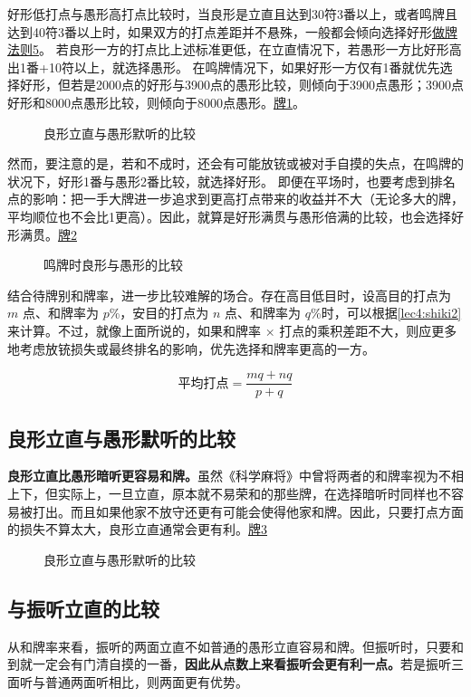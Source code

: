好形低打点与愚形高打点比较时，当良形是立直且达到30符3番以上，或者鸣牌且达到40符3番以上时，如果双方的打点差距并不悬殊，一般都会倾向选择好形\hyperref[lec1:rule5]{做牌法则5}。
若良形一方的打点比上述标准更低，在立直情况下，若愚形一方比好形高出1番+10符以上，就选择愚形。
在鸣牌情况下，如果好形一方仅有1番就优先选择好形，但若是2000点的好形与3900点的愚形比较，则倾向于3900点愚形；3900点好形和8000点愚形比较，则倾向于8000点愚形。\hyperref[lec4:pai1]{牌1}。
\begin{figure}[h]
    \caption{良形立直与愚形默听的比较}\label{lec4:pai1}
\end{figure}
然而，要注意的是，若和不成时，还会有可能放铳或被对手自摸的失点，在鸣牌的状况下，好形1番与愚形2番比较，就选择好形。
即便在平场时，也要考虑到排名点的影响：把一手大牌进一步追求到更高打点带来的收益并不大（无论多大的牌，平均顺位也不会比1更高）。因此，就算是好形满贯与愚形倍满的比较，也会选择好形满贯。\hyperref[lec4:pai2]{牌2}
\begin{figure}[h]
    \caption{鸣牌时良形与愚形的比较}\label{lec4:pai2}
\end{figure}
结合待牌别和牌率，进一步比较难解的场合。存在高目低目时，设高目的打点为 $m$ 点、和牌率为 $p$\%，安目的打点为 $n$ 点、和牌率为 $q$\%时，可以根据\ref{lec4:shiki2}来计算。不过，就像上面所说的，如果和牌率 × 打点的乘积差距不大，则应更多地考虑放铳损失或最终排名的影响，优先选择和牌率更高的一方。
\begin{shiki}[高低目的平均打点]\label{lec4:shiki2}
    \[\mathrm{平均打点} = \frac{mq+nq}{p+q}\]
\end{shiki}

\subsection{良形立直与愚形默听的比较}
\textbf{良形立直比愚形暗听更容易和牌。}虽然《科学麻将》中曾将两者的和牌率视为不相上下，但实际上，一旦立直，原本就不易荣和的那些牌，在选择暗听时同样也不容易被打出。而且如果他家不放守还更有可能会使得他家和牌。因此，只要打点方面的损失不算太大，良形立直通常会更有利。\hyperref[lec4:pai3]{牌3}
\begin{figure}[h]
    \caption{良形立直与愚形默听的比较}\label{lec4:pai3}
\end{figure}

\subsection{与振听立直的比较}
从和牌率来看，振听的两面立直不如普通的愚形立直容易和牌。但振听时，只要和到就一定会有门清自摸的一番，\textbf{因此从点数上来看振听会更有利一点。}若是振听三面听与普通两面听相比，则两面更有优势。

